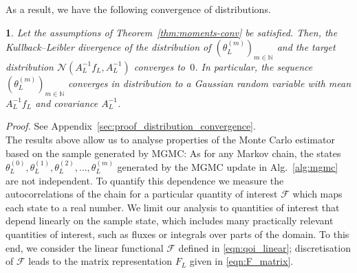 \documentclass[11pt,english]{article}
\theoremstyle{plain}
\theoremstyle{plain}
\theoremstyle{plain}
\theoremstyle{plain}
\newtheorem{cor}[thm]{\protect\corollaryname}
\numberwithin{equation}{section}
\newcommand{\rev}[1]{#1}
\providecommand{\corollaryname}{Corollary}
\begin{document}
As a result, we have the following convergence of distributions.
\begin{cor}
	\label{cor:conv-dist}Let the assumptions of Theorem~\ref{thm:moments-conv}
	be satisfied. Then, the Kullback--Leibler divergence of the distribution
	of $(\theta_{L}^{(m)})_{m\in\mathbb{N}}$ and the target distribution
	$\mathcal{N}(A_{L}^{-1}f_{L},A_{L}^{-1})$ converges to~$0$.
	In particular, the sequence $(\theta_{L}^{(m)})_{m\in\mathbb{N}}$
	converges  in distribution to a Gaussian random variable with mean $A_{L}^{-1}f_{L}$
	and covariance $A_{L}^{-1}$.
\end{cor}
\noindent\textit{Proof.} See Appendix~\ref{sec:proof_distribution_convergence}.\\[1ex]
The results above allow us to analyse properties of the Monte Carlo estimator based on the sample generated by MGMC: As for any Markov chain, the states $\theta_L^{(0)}, \theta_L^{(1)}, \theta_L^{(2)},\dots,\theta_L^{(m)}$ generated by the MGMC update in Alg.~\ref{alg:mgmc} are not independent. To quantify this dependence we measure the autocorrelations of the chain for a particular quantity of interest $\mathcal{F}$ which maps each state to a real number. We limit our analysis to quantities of interest that depend linearly on the sample state, \rev{which includes many practically relevant quantities of interest, such as fluxes or integrals over parts of the domain}.
To this end, we consider the linear functional $\mathcal{F}$ defined in \eqref{eqn:qoi_linear}; discretisation of $\mathcal{F}$ leads to the matrix representation $F_L$ given in \eqref{eqn:F_matrix}.
\end{document}
